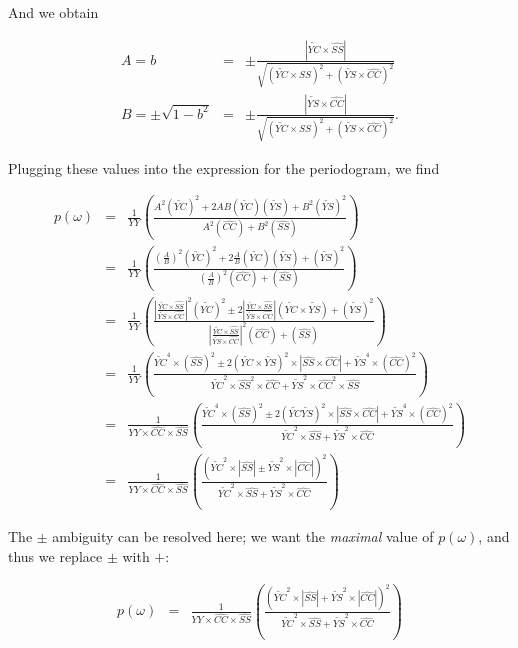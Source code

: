 \documentclass[notitlepage]{article}
\newcommand{\YC}[1][n]{\widetilde{YC}}
\newcommand{\YS}[1][n]{\widetilde{YS}}
\newcommand{\YY}{YY}
\newcommand{\hatCC}[1][nm]{\widehat{CC}}
\newcommand{\hatSS}[1][nm]{\widehat{SS}}
\begin{document}
And we obtain

\begin{eqnarray}
A = b &=& \pm\frac{|\YC\times\hatSS|}{\sqrt{\left(\YC\times\hatSS\right)^2 +\left(\YS\times\hatCC\right)^2}}\\
B = \pm\sqrt{1 - b^2} &=& \pm\frac{|\YS\times\hatCC|}{\sqrt{\left(\YC\times\hatSS\right)^2 +\left(\YS\times\hatCC\right)^2}}.
\end{eqnarray}

Plugging these values into the expression for the periodogram, we find


\begin{eqnarray}
p(\omega) &=& \frac{1}{\YY}\left(\frac{ A^2(\YC)^2 + 2AB(\YC)(\YS) + B^2(\YS)^2}{ A^2(\hatCC) + B^2(\hatSS)}\right)\\
		  &=& \frac{1}{\YY}\left(\frac{ \left(\frac{A}{B}\right)^2(\YC)^2 + 2\frac{A}{B}(\YC)(\YS) + (\YS)^2}{ \left(\frac{A}{B}\right)^2(\hatCC) + (\hatSS)}\right)\\
		  &=& \frac{1}{\YY}\left(\frac{ \left|\frac{\YC\times\hatSS}{\YS\times\hatCC}\right|^2(\YC)^2 \pm 2\left|\frac{\YC\times\hatSS}{\YS\times\hatCC}\right|(\YC\times\YS) + (\YS)^2}{ \left|\frac{\YC\times\hatSS}{\YS\times\hatCC}\right|^2(\hatCC) + (\hatSS)}\right)\\
		  &=& \frac{1}{\YY}\left(\frac{ \YC^4\times(\hatSS)^2 \pm 2\left(\YC\times\YS\right)^2\times|\hatSS\times\hatCC| + \YS^4\times(\hatCC)^2}{ \YC^2\times\hatSS^2\times\hatCC + \YS^2\times\hatCC^2\times\hatSS}\right)\\
		  &=& \frac{1}{\YY\times\hatCC\times\hatSS}\left(\frac{ \YC^4\times(\hatSS)^2 \pm 2\left(\YC\YS\right)^2\times\left|\hatSS\times\hatCC\right| + \YS^4\times(\hatCC)^2}{ \YC^2\times\hatSS + \YS^2\times\hatCC}\right)\\
		  &=& \frac{1}{\YY\times\hatCC\times\hatSS}\left(\frac{ \left(\YC^2\times\left|\hatSS\right| \pm \YS^2\times\left|\hatCC\right|\right)^2}{ \YC^2\times\hatSS + \YS^2\times\hatCC}\right)
\end{eqnarray}

The $\pm$ ambiguity can be resolved here; we want the \emph{maximal} value of $p(\omega)$, and thus we replace $\pm$ with $+$:

\begin{eqnarray}
p(\omega) &=& \frac{1}{\YY\times\hatCC\times\hatSS}\left(\frac{ \left(\YC^2\times\left|\hatSS\right| + \YS^2\times\left|\hatCC\right|\right)^2}{ \YC^2\times\hatSS + \YS^2\times\hatCC}\right)
\end{eqnarray}
\end{document}
